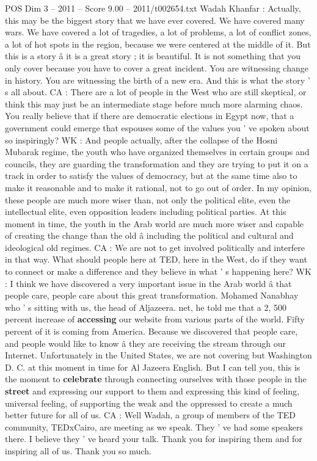 \begin{textsample}{POS Dim 3 – 2011 – Score 9.00 – 2011/t002654.txt}
Wadah Khanfar : Actually, this may be the biggest story that we have ever covered.
We have covered many wars.
We have covered a lot of tragedies, a lot of problems, a lot of conflict zones, a lot of hot spots in the region, because we were centered at the middle of it.
But this is a story â it is a great story ; it is beautiful.
It is not something that you only cover because you have to cover a great incident.
You are witnessing change in history.
You are witnessing the birth of a new era.
And this is what the story ' s all about.
CA : There are a lot of people in the West who are still skeptical, or think this may just be an intermediate stage before much more alarming chaos.
You really believe that if there are democratic elections in Egypt now, that a government could emerge that espouses some of the values you ' ve spoken about so inspiringly?
WK : And people actually, after the collapse of the Hosni Mubarak regime, the youth who have organized themselves in certain groups and councils, they are guarding the transformation and they are trying to put it on a track in order to satisfy the values of democracy, but at the same time also to make it reasonable and to make it rational, not to go out of order.
In my opinion, these people are much more wiser than, not only the political elite, even the intellectual elite, even opposition leaders including political parties.
At this moment in time, the youth in the Arab world are much more wiser and capable of creating the change than the old â including the political and cultural and ideological old regimes.
CA : We are not to get involved politically and interfere in that way.
What should people here at TED, here in the West, do if they want to connect or make a difference and they believe in what ' s happening here?
WK : I think we have discovered a very important issue in the Arab world â that people care, people care about this great transformation.
Mohamed Nanabhay who ' s sitting with us, the head of Aljazeera. net, he told me that a 2, 500 percent increase of \textbf{accessing} our website from various parts of the world.
Fifty percent of it is coming from America.
Because we discovered that people care, and people would like to know â they are receiving the stream through our Internet.
Unfortunately in the United States, we are not covering but Washington D.
C. at this moment in time for Al Jazeera English.
But I can tell you, this is the moment to \textbf{celebrate} through connecting ourselves with those people in the \textbf{street} and expressing our support to them and expressing this kind of feeling, universal feeling, of supporting the weak and the oppressed to create a much better future for all of us.
CA : Well Wadah, a group of members of the TED community, TEDxCairo, are meeting as we speak.
They ' ve had some speakers there.
I believe they ' ve heard your talk.
Thank you for inspiring them and for inspiring all of us.
Thank you so much.

\end{textsample}
